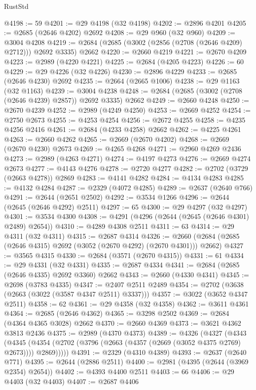 \begin{lexlean}{RustStd}
\begin{coremodule}
@4198 := 59
@4201 := @29 @4198 (@32 @4198)
@4202 := @2896 @4201
@4205 := @2685 (@2646 @4202) @2692
@4208 := @29 @960 (@32 @960)
@4209 := @3004 @4208
@4219 := @2684 (@2685 (@3002 (@2856 (@2708 (@2646 @4209) @2712))) @2692 @3335) @2662
@4220 := @2660 @4219
@4221 := @2670 @4209
@4223 := @2989 (@4220 @4221)
@4225 := @2684 (@4205 @4223)
@4226 := 60
@4229 := @29 @4226 (@32 @4226)
@4230 := @2896 @4229
@4233 := @2685 (@2646 @4230) @2692
@4235 := @2664 (@2665 @1006)
@4238 := @29 @1163 (@32 @1163)
@4239 := @3004 @4238
@4248 := @2684 (@2685 (@3002 (@2708 (@2646 @4239) @2857)) @2692 @3335) @2662
@4249 := @2660 @4248
@4250 := @2670 @4239
@4252 := @2989 (@4249 @4250)
@4253 := @2669 @4252
@4254 := @2750 @2673
@4255 := @4253 @4254
@4256 := @2672 @4255
@4258 := @4235 @4256 @2416
@4261 := @2684 (@4233 @4258) @2662
@4262 := @4225 @4261
@4263 := @2660 @4262
@4265 := @2669 (@2670 @4202)
@4268 := @2669 (@2670 @4230) @2673
@4269 := @4265 @4268
@4271 := @2960 @4269 @2436
@4273 := @2989 (@4263 @4271)
@4274 := @4197 @4273
@4276 := @2669 @4274 @2673
@4277 := @4143 @4276
@4278 := @2720 @4277
@4282 := @2702 (@3729 (@2663 @4278)) @2869
@4283 := @4141 @4282
@4284 := @4134 @4283
@4285 := @4132 @4284
@4287 := @2329 (@4072 @4285)
@4289 := @2637 (@2640 @766)
@4291 := @2644 (@2651 @2502)
@4292 := @3534 @1266
@4296 := @2644 (@2645 (@2646 @4292) @2511)
@4297 := 65
@4300 := @29 @4297 (@32 @4297)
@4301 := @3534 @4300
@4308 := @4291 (@4296 (@2644 (@2645 (@2646 @4301) @2489) @2654))
@4310 := @4289 @4308 @2511
@4311 := 63
@4314 := @29 @4311 (@32 @4311)
@4315 := @2687 @4314
@4326 := @2660 (@2684 (@2685 (@2646 @4315) @2692 (@3052 (@2670 @4292) (@2670 @4301))) @2662)
@4327 := @3565 @4315
@4330 := @2684 (@3571 (@2670 @4315))
@4331 := 61
@4334 := @29 @4331 (@32 @4331)
@4335 := @2687 @4334
@4341 := @2684 (@2685 (@2646 @4335) @2692 @3360) @2662
@4343 := @2660 (@4330 @4341)
@4345 := @2698 (@3783 @4335)
@4347 := @2407 @2511 @2489
@4354 := @2702 (@3638 (@2663 (@3022 (@3587 @4347 @2511) @3337)))
@4357 := @3022 (@3652 @4347 @2511)
@4358 := 62
@4361 := @29 @4358 (@32 @4358)
@4362 := @3611 @4361
@4364 := @2685 (@2646 @4362)
@4365 := @3298 @2502
@4369 := @2684 (@4364 @4365 @3028) @2662
@4370 := @2660 @4369
@4373 := @3621 @4362 @3813 @2436
@4375 := @2989 (@4370 @4373)
@4389 := @4326
    (@4327
      (@4343
        (@4345 (@4354 (@2702 (@3796 (@2663 (@4357 (@2669 (@3052 @4375 @2769) @2673)))) @2869)))))
@4391 := @2329 (@4310 @4389)
@4393 := @2637 (@2640 @771)
@4395 := @2644 (@2886 @2511)
@4400 := @2981 (@4395 (@2644 (@3969 @2354) @2654))
@4402 := @4393 @4400 @2511
@4403 := 66
@4406 := @29 @4403 (@32 @4403)
@4407 := @2687 @4406

\end{coremodule}
\end{lexlean}
